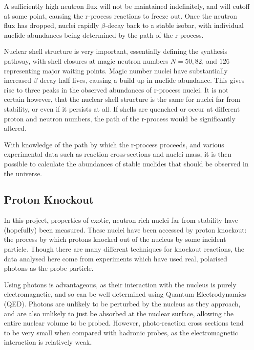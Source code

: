 \documentclass[a4paper,12pt]{article}
\begin{document}
A sufficiently high neutron flux will not be maintained indefinitely, and will cutoff at some point, causing the r-process reactions to freeze out. Once the neutron flux has dropped, nuclei rapidly $\beta$-decay back to a stable isobar, with individual nuclide abundances being determined by the path of the r-process.

Nuclear shell structure is very important, essentially defining the synthesis pathway, with shell closures at magic neutron numbers $N=50,82$, and $126$ representing major waiting points. Magic number nuclei have substantially increased $\beta$-decay half lives\cite{iliadis}{}, causing a build up in nuclide abundance. This gives rise to three peaks in the observed abundances of r-process nuclei\cite{b2fh}{}. It is not certain however, that the nuclear shell structure is the same for nuclei far from stability, or even if it persists at all\cite{warner}{}. If shells are quenched or occur at different proton and neutron numbers, the path of the r-process would be significantly altered.

With knowledge of the path by which the r-process proceeds, and various experimental data such as reaction cross-sections and nuclei mass,  it is then possible to calculate the abundances of stable nuclides that should be observed in the universe\cite{seeger}{}.

\subsection{Proton Knockout}
In this project, properties of exotic, neutron rich nuclei far from stability have (hopefully) been measured. These nuclei have been accessed by proton knockout: the process by which protons knocked out of the nucleus by some incident particle. Though there are many different techniques for knockout reactions, the data analysed here come from experiments which have used real, polarised photons as the probe particle. 

Using photons is advantageous, as their interaction with the nucleus is purely electromagnetic, and so can be well determined using Quantum Electrodynamics (QED). Photons are unlikely to be perturbed by the nucleus as they approach, and are also unlikely to just be absorbed at the nuclear surface, allowing the entire nuclear volume to be probed\cite{robinson}{}. However, photo-reaction cross sections tend to be very small when compared with hadronic probes, as the electromagnetic interaction is relatively weak\cite{robinson}{}.
\end{document}
